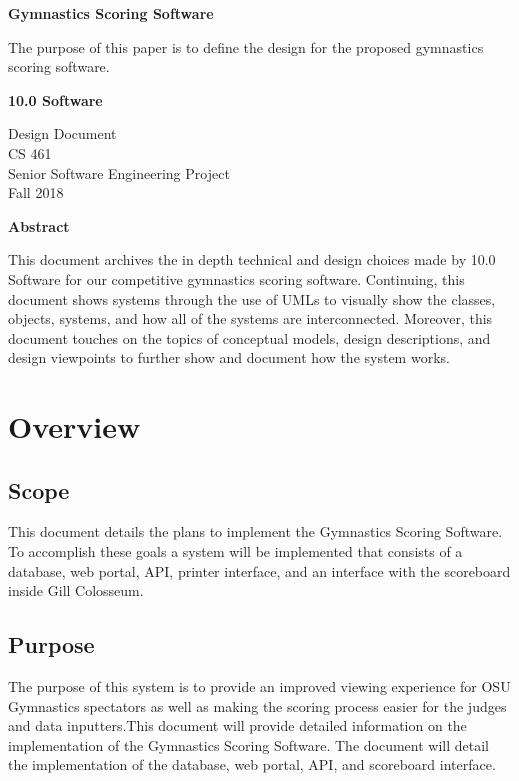 \documentclass[letterpaper,10pt,draftclsnofoot,onecolumn,]{article}
\begin{document}
\noindent
\begin{titlepage}
    \begin{center}
        \vspace*{1cm}
        
        \textbf{\huge{Gymnastics Scoring Software}}
        
        \vspace{0.5cm}
        \large{The purpose of this paper is to define the design for the proposed gymnastics scoring software.}
        
        \vspace{1.5cm}
        
        \textbf{\LARGE{10.0 Software}}
        
        \Large{Design Document\\
        CS 461\\
        Senior Software Engineering Project\\
        Fall 2018}
        \vspace*{\fill}
        \begin{center}
            \textbf{\large{Abstract}}
        \end{center}
        \normalsize{This document archives the in depth technical and design choices made by 10.0 Software for our competitive gymnastics scoring software. Continuing, this document shows systems through the use of UMLs to visually show the classes, objects, systems, and how all of the systems are interconnected. Moreover, this document touches on the topics of conceptual models, design descriptions, and design viewpoints to further show and document how the system works.}
    \end{center}
\end{titlepage}

\tableofcontents
\newpage

\section{Overview}
\subsection{Scope}
This document details the plans to implement the Gymnastics Scoring Software. To accomplish these goals a system will be implemented that consists of a database, web portal, API, printer interface, and an interface with the scoreboard inside Gill Colosseum. 
\subsection{Purpose}
The purpose of this system is to provide an improved viewing experience for OSU Gymnastics spectators as well as making the scoring process easier for the judges and data inputters.This document will provide detailed information on the implementation of the Gymnastics Scoring Software. The document will detail the implementation of the database, web portal, API, and scoreboard interface. 
\end{document}
